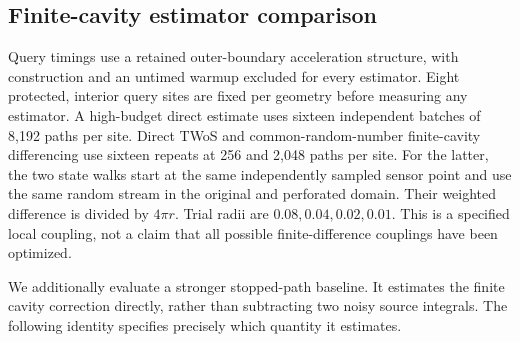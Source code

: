 \subsection{Finite-cavity estimator comparison}
Query timings use a retained outer-boundary acceleration structure, with
construction and an untimed warmup excluded for every estimator. Eight
protected, interior query sites are fixed per geometry before measuring
any estimator. A high-budget direct estimate uses sixteen independent batches
of 8,192 paths per site. Direct TWoS and common-random-number finite-cavity
differencing use sixteen repeats at 256 and 2,048 paths per site. For the latter,
the two state walks start at the same independently sampled sensor point and
use the same random stream in the original and perforated domain. Their
weighted difference is divided by $4\pi r$. Trial radii are
$0.08,0.04,0.02,0.01$. This is a specified local coupling, not a claim that
all possible finite-difference couplings have been optimized.

We additionally evaluate a stronger stopped-path baseline. It estimates the
finite cavity correction directly, rather than subtracting two noisy source
integrals. The following identity specifies precisely which quantity it estimates.

